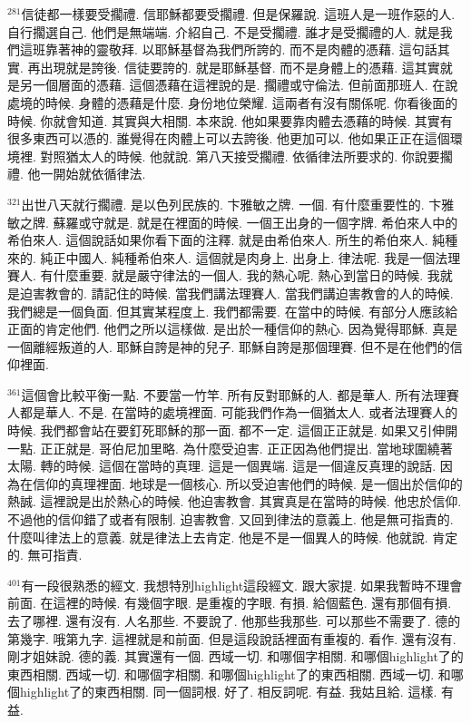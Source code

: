 \documentclass{book}
\begin{document}
$^{281}$信徒都一樣要受擱禮.
信耶穌都要受擱禮.
但是保羅說.
這班人是一班作惡的人.
自行擱選自己.
他們是無端端.
介紹自己.
不是受擱禮.
誰才是受擱禮的人.
就是我們這班靠著神的靈敬拜.
以耶穌基督為我們所誇的.
而不是肉體的憑藉.
這句話其實.
再出現就是誇後.
信徒要誇的.
就是耶穌基督.
而不是身體上的憑藉.
這其實就是另一個層面的憑藉.
這個憑藉在這裡說的是.
擱禮或守倫法.
但前面那班人.
在說處境的時候.
身體的憑藉是什麼.
身份地位榮耀.
這兩者有沒有關係呢.
你看後面的時候.
你就會知道.
其實與大相關.
本來說.
他如果要靠肉體去憑藉的時候.
其實有很多東西可以憑的.
誰覺得在肉體上可以去誇後.
他更加可以.
他如果正正在這個環境裡.
對照猶太人的時候.
他就說.
第八天接受擱禮.
依循律法所要求的.
你說要擱禮.
他一開始就依循律法.

$^{321}$出世八天就行擱禮.
是以色列民族的.
卞雅敏之牌.
一個.
有什麼重要性的.
卞雅敏之牌.
蘇羅或守就是.
就是在裡面的時候.
一個王出身的一個字牌.
希伯來人中的希伯來人.
這個說話如果你看下面的注釋.
就是由希伯來人.
所生的希伯來人.
純種來的.
純正中國人.
純種希伯來人.
這個就是肉身上.
出身上.
律法呢.
我是一個法理賽人.
有什麼重要.
就是嚴守律法的一個人.
我的熱心呢.
熱心到當日的時候.
我就是迫害教會的.
請記住的時候.
當我們講法理賽人.
當我們講迫害教會的人的時候.
我們總是一個負面.
但其實某程度上.
我們都需要.
在當中的時候.
有部分人應該給正面的肯定他們.
他們之所以這樣做.
是出於一種信仰的熱心.
因為覺得耶穌.
真是一個離經叛道的人.
耶穌自誇是神的兒子.
耶穌自誇是那個理賽.
但不是在他們的信仰裡面.

$^{361}$這個會比較平衡一點.
不要當一竹竿.
所有反對耶穌的人.
都是華人.
所有法理賽人都是華人.
不是.
在當時的處境裡面.
可能我們作為一個猶太人.
或者法理賽人的時候.
我們都會站在要釘死耶穌的那一面.
都不一定.
這個正正就是.
如果又引伸開一點.
正正就是.
哥伯尼加里略.
為什麼受迫害.
正正因為他們提出.
當地球圍繞著太陽.
轉的時候.
這個在當時的真理.
這是一個異端.
這是一個違反真理的說話.
因為在信仰的真理裡面.
地球是一個核心.
所以受迫害他們的時候.
是一個出於信仰的熱誠.
這裡說是出於熱心的時候.
他迫害教會.
其實真是在當時的時候.
他忠於信仰.
不過他的信仰錯了或者有限制.
迫害教會.
又回到律法的意義上.
他是無可指責的.
什麼叫律法上的意義.
就是律法上去肯定.
他是不是一個異人的時候.
他就說.
肯定的.
無可指責.

$^{401}$有一段很熟悉的經文.
我想特別highlight這段經文.
跟大家提.
如果我暫時不理會前面.
在這裡的時候.
有幾個字眼.
是重複的字眼.
有損.
給個藍色.
還有那個有損.
去了哪裡.
還有沒有.
人名那些.
不要說了.
他那些我那些.
可以那些不需要了.
德的第幾字.
哦第九字.
這裡就是和前面.
但是這段說話裡面有重複的.
看作.
還有沒有.
剛才姐妹說.
德的義.
其實還有一個.
西域一切.
和哪個字相關.
和哪個highlight了的東西相關.
西域一切.
和哪個字相關.
和哪個highlight了的東西相關.
西域一切.
和哪個highlight了的東西相關.
同一個詞根.
好了.
相反詞呢.
有益.
我姑且給.
這樣.
有益.
\end{document}
